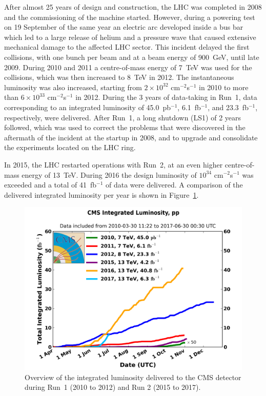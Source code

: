 After almost 25 years of design and construction, the \ac{LHC} was completed in 2008 and the commissioning of the machine started. However, during a powering test on 19 September of the same year an electric arc developed inside a bus bar which led to a large release of helium and a pressure wave that caused extensive mechanical damage to the affected LHC sector. This incident delayed the first collisions, with one bunch per beam and at a beam energy of \SI{900}{GeV}, until late 2009. During 2010 and 2011 a centre-of-mass energy of \SI{7}{TeV} was used for the collisions, which was then increased to \SI{8}{TeV} in 2012. The instantaneous luminosity was also increased, starting from $2 \times 10^{32}$ cm$^{-2}$s$^{-1}$ in 2010 to more than $6 \times 10^{33}$ cm$^{-2}$s$^{-1}$ in 2012. During the 3 years of data-taking in Run~1, data corresponding to an integrated luminosity of 45.0~pb$^{-1}$, 6.1~fb$^{-1}$, and 23.3~fb$^{-1}$, respectively, were delivered. After Run~1, a long shutdown (LS1) of 2 years followed, which was used to correct the problems that were discovered in the aftermath of the incident at the startup in 2008, and to upgrade and consolidate the experiments located on the \ac{LHC} ring.

In 2015, the \ac{LHC} restarted operations with Run~2, at an even higher centre-of-mass energy of \SI{13}{TeV}. During 2016 the design luminosity of $10^{34}$ cm$^{-2}$s$^{-1}$ was exceeded and a total of 41~fb$^{-1}$ of data were delivered. A comparison of the delivered integrated luminosity per year is shown in Figure~\ref{fig:lumi}.

\begin{figure}[ht]
  \centering
 \includegraphics[width=.75\textwidth]{CMS_lumi_allyears}
 \caption{Overview of the integrated luminosity delivered to the CMS detector during Run~1 (2010 to 2012) and Run 2 (2015 to 2017).}
 \label{fig:lumi}
\end{figure}

